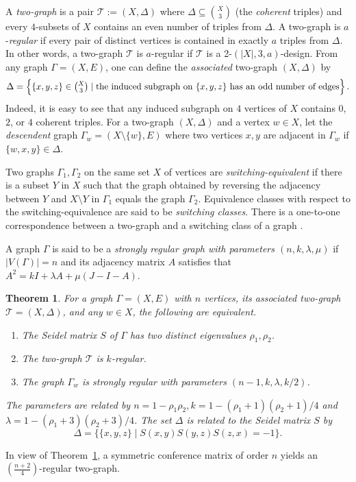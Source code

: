 \documentclass[11pt,oneside]{amsart}
\newtheorem{theorem}{Theorem}[section]
\newcommand{\defn}[1]{\textit{#1}}
\begin{document}
{A \defn{two-graph} is a pair $\mathcal{T}:= (X,\Delta)$ where $\Delta\subseteq \binom{X}{3}$ (the \emph{coherent} triples)
and every $4$-subsets of $X$ contains an even number of  triples from $\Delta$. A two-graph  is $a$-\defn{regular} if every pair of distinct vertices is contained in exactly $a$ triples from $\Delta$. In other words, a two-graph $\mathcal{T}$ is $a$-regular if $\mathcal{T}$ is a 2-$(|X|, 3, a)$-design. From any graph $\Gamma=(X,E)$, one can define the \textit{associated}  two-graph $(X,\Delta)$ by 
\[
\Delta=\left\{\{x,y,z\}\in\tbinom{X}{3} \mid \text{the induced subgraph on $\{x,y,z\}$ has an odd number of edges}\right\}.
\]
Indeed, it is easy to see that any induced subgraph on $4$ vertices of $X$ contains $0$, $2$, or $4$ coherent triples. 
For a two-graph $(X,\Delta)$ and a vertex $w \in X$, let the \textit{descendent} graph $\Gamma_w=(X\setminus \{w\},E)$
where  two vertices $x,y$ are adjacent in $\Gamma_w$ if %
$\{w,x,y\}\in\Delta$.

Two graphs $\Gamma_1, \Gamma_2$ on the same set $X$ of vertices are \defn{switching-equivalent} if there is a subset $Y$ in $X$ such that the graph obtained by reversing the adjacency between $Y$ and $X\setminus Y$ in $\Gamma_1$ equals the graph $\Gamma_2$. 
Equivalence classes with respect to the switching-equivalence are said to be \defn{switching classes}.  
There is a one-to-one correspondence between a two-graph and a switching class of a graph \cite{MR2882891}. 


A graph $\Gamma$ is said to be a \defn{strongly regular graph with parameters $(n,k,\lambda,\mu)$} if $|V(\Gamma)|=n$ and its adjacency matrix $A$ satisfies that $A^2=kI+\lambda A+\mu(J-I-A)$. 
\begin{theorem}\cite{MR2882891}\label{thm:rt-ast}
    For a graph $\Gamma=(X,E)$ with $n$ vertices, its associated two-graph $\mathcal{T}=(X,\Delta)$, and any  $w\in X$, the following are equivalent.
    \begin{enumerate}
        \item [\textup{(i)}] The Seidel matrix $S$ of $\Gamma$ has two distinct eigenvalues $\rho_1,\rho_2$. 
        \item [\textup{(ii)}] The two-graph $\mathcal{T}$ is $k$-regular. 
        \item [\textup{(iii)}] The graph $\Gamma_w$ is  strongly regular  with parameters $(n-1,k,\lambda,k/2)$. 
    \end{enumerate}
    The parameters are related by $n=1-\rho_1\rho_2,k=1-(\rho_1+1)(\rho_2+1)/4$ and $\lambda=1-(\rho_1+3)(\rho_2+3)/4$. The set $\Delta$ is related to the Seidel matrix $S$ by 
\[
\Delta=\big\{\{x,y,z\} \mid S(x,y)S(y,z)S(z,x)=-1\big\}. 
\]
\end{theorem}
In view of Theorem~\ref{thm:rt-ast}, a symmetric conference matrix of order $n$ yields an $(\frac{n+2}{4})$-regular two-graph. 





}
\end{document}
